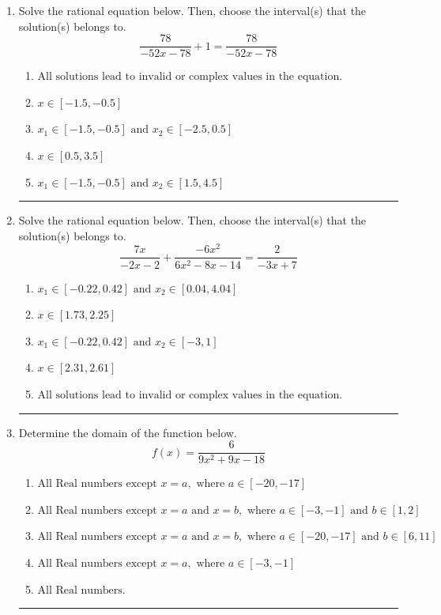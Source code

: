 \documentclass[14pt]{extbook}
\newcommand{\litem}[1]{\item#1\hspace*{-1cm}\rule{\textwidth}{0.4pt}}
\begin{document}
\begin{enumerate}
{\begin{enumerate}[label=\Alph*.]
\end{enumerate} }
\litem{
Solve the rational equation below. Then, choose the interval(s) that the solution(s) belongs to.\[ \frac{78}{-52x -78} + 1 = \frac{78}{-52x -78} \]\begin{enumerate}[label=\Alph*.]
\item \( \text{All solutions lead to invalid or complex values in the equation.} \)
\item \( x \in [-1.5,-0.5] \)
\item \( x_1 \in [-1.5, -0.5] \text{ and } x_2 \in [-2.5,0.5] \)
\item \( x \in [0.5,3.5] \)
\item \( x_1 \in [-1.5, -0.5] \text{ and } x_2 \in [1.5,4.5] \)

\end{enumerate} }
\litem{
Solve the rational equation below. Then, choose the interval(s) that the solution(s) belongs to.\[ \frac{7x}{-2x -2} + \frac{-6x^{2}}{6x^{2} -8 x -14} = \frac{2}{-3x + 7} \]\begin{enumerate}[label=\Alph*.]
\item \( x_1 \in [-0.22, 0.42] \text{ and } x_2 \in [0.04,4.04] \)
\item \( x \in [1.73,2.25] \)
\item \( x_1 \in [-0.22, 0.42] \text{ and } x_2 \in [-3,1] \)
\item \( x \in [2.31,2.61] \)
\item \( \text{All solutions lead to invalid or complex values in the equation.} \)

\end{enumerate} }
\litem{
Determine the domain of the function below.\[ f(x) = \frac{6}{9x^{2} +9 x -18} \]\begin{enumerate}[label=\Alph*.]
\item \( \text{All Real numbers except } x = a, \text{ where } a \in [-20, -17] \)
\item \( \text{All Real numbers except } x = a \text{ and } x = b, \text{ where } a \in [-3, -1] \text{ and } b \in [1, 2] \)
\item \( \text{All Real numbers except } x = a \text{ and } x = b, \text{ where } a \in [-20, -17] \text{ and } b \in [6, 11] \)
\item \( \text{All Real numbers except } x = a, \text{ where } a \in [-3, -1] \)
\item \( \text{All Real numbers.} \)


\end{enumerate}}
\end{enumerate}
\end{document}
